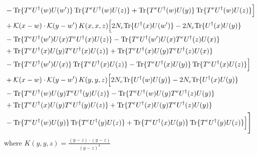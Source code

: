 \documentclass[9pt]{article}
\numberwithin{equation}{section}
\begin{document}
\begin{align}
&-{\rm Tr}\{T^eU^\dagger(w)U(w')\}\,{\rm Tr}\{T^eU^\dagger(w)U(z)\}+{\rm Tr}\{T^eU^\dagger(w)U(y)\}\,{\rm Tr}\{T^eU^\dagger(w)U(z)\}\Big]\notag\\
&+\mathcal K(x-w)\cdot\mathcal K(y-w')\,K(x,x,z)\Big[2 N_c{\rm Tr}\{U^\dagger(x)U(w')\}-2 N_c{\rm Tr}\{U^\dagger(x)U(y)\}\notag\\
&-{\rm Tr}\{T^eU^\dagger(w')U(x)T^eU^\dagger(x)U(z)\}-{\rm Tr}\{T^eU^\dagger(w')U(x)T^eU^\dagger(z)U(x)\}\notag\\
&+{\rm Tr}\{T^eU^\dagger(x)U(y)T^eU^\dagger(x)U(z)\}+{\rm Tr}\{T^eU^\dagger(x)U(y)T^eU^\dagger(z)U(x)\}\notag\\
&-{\rm Tr}\{T^eU^\dagger(w')U(x)\}\,{\rm Tr}\{T^eU^\dagger(x)U(z)\}-{\rm Tr}\{T^eU^\dagger(x)U(y)\}\,{\rm Tr}\{T^eU^\dagger(x)U(z)\}\Big]\notag\\
&+\mathcal K(x-w)\cdot\mathcal K(y-w')\,K(y,y,z)\Big[2 N_c{\rm Tr}\{U^\dagger(w)U(y)\}-2 N_c{\rm Tr}\{U^\dagger(x)U(y)\}\notag\\
&-{\rm Tr}\{T^eU^\dagger(w)U(y)T^eU^\dagger(y)U(z)\}-{\rm Tr}\{T^eU^\dagger(w)U(y)T^eU^\dagger(z)U(y)\}\notag\\
&+{\rm Tr}\{T^eU^\dagger(x)U(y)T^eU^\dagger(y)U(z)\}+{\rm Tr}\{T^eU^\dagger(x)U(y)T^eU^\dagger(z)U(y)\}\notag\\
&-{\rm Tr}\{T^eU^\dagger(w)U(y)\}\,{\rm Tr}\{T^eU^\dagger(y)U(z)\}+{\rm Tr}\{T^eU^\dagger(x)U(y)\}\,{\rm Tr}\{T^eU^\dagger(y)U(z)\}\Big]\Bigg]
\end{align}
where $K(y,y,z) = \frac{(y-z)\cdot (y-z)}{(y-z)^{4}}$
\end{document}
